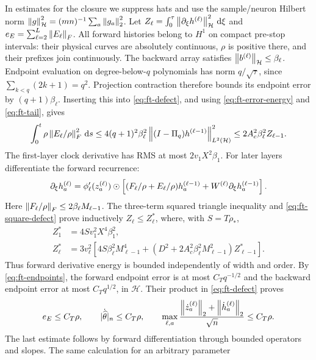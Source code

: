In estimates for the closure we suppress hats and use the sample/neuron
Hilbert norm
$\left\lVert g\right\rVert_{\mathcal H}^2=(mn)^{-1}\sum_a\left\lVert g_a\right\rVert_2^2$.
Let $Z_\ell=\int_0^\tau\left\lVert \partial_\xi h^{(\ell)}\right\rVert_{\mathcal H}^2
\,\mathrm{d}\xi$ and $e_E=\sum_{\ell=2}^L\left\lVert E_\ell\right\rVert_F$.
All forward histories belong to $H^1$ on compact pre-stop intervals:
their physical curves are absolutely continuous, $\rho$ is positive
there, and their prefixes join continuously.
The backward array satisfies $\left\lVert b^{(\ell)}\right\rVert_{\mathcal H}\le\beta_\ell$.
Endpoint evaluation on degree-below-$q$ polynomials has norm
$q/\sqrt\tau$, since $\sum_{k<q}(2k+1)=q^2$.
Projection contraction therefore bounds its endpoint error by
$(q+1)\beta_\ell$.  Inserting this into \eqref{eq:ft-defect}, and using
\eqref{eq:ft-error-energy} and \eqref{eq:ft-tail}, gives
\begin{equation}
 \int_0^t\rho\left\lVert E_\ell/\rho\right\rVert_F^2\,\mathrm{d} s
 \le4(q+1)^2\beta_\ell^2
       \left\lVert (I-\Pi_q)h^{(\ell-1)}\right\rVert_{L^2(\mathcal H)}^2
 \le2A_c^2\beta_\ell^2Z_{\ell-1}.
 \label{eq:ft-square-defect}
\end{equation}
The first-layer clock derivative has RMS at most
$2v_1X^2\beta_1$.  For later layers differentiate the forward recurrence:
\[
 \partial_\xi h_a^{(\ell)}=\phi_\ell'(z_a^{(\ell)})\mathbin{\odot}
 \left[(F_\ell/\rho+E_\ell/\rho)h_a^{(\ell-1)}
                    +W^{(\ell)}\partial_\xi h_a^{(\ell-1)}\right].
\]
Here $\left\lVert F_\ell/\rho\right\rVert_F\le2\beta_\ell M_{\ell-1}$.
The three-term squared triangle inequality and
\eqref{eq:ft-square-defect} prove inductively $Z_\ell\le Z_\ell^*$,
where, with $S=T\rho_*$,
\begin{align*}
 Z_1^*&=4Sv_1^2X^4\beta_1^2,\\
 Z_\ell^*&=3v_\ell^2\left[
       4S\beta_\ell^2M_{\ell-1}^4+
       (D^2+2A_c^2\beta_\ell^2M_{\ell-1}^2)Z_{\ell-1}^*\right].
\end{align*}
Thus forward derivative energy is bounded independently of width and order.
By \eqref{eq:ft-endpoints}, the forward endpoint error is at most
$C_Tq^{-1/2}$ and the backward endpoint error at most $C_Tq^{1/2}$,
in $\mathcal H$.  Their product in \eqref{eq:ft-defect} proves
\begin{equation}
 e_E\le C_T\rho,\qquad |\dot{\widehat\theta}|_n\le C_T\rho,
 \qquad\max_{\ell,a}
 \frac{\left\lVert \dot z_a^{(\ell)}\right\rVert_2+\left\lVert \dot h_a^{(\ell)}\right\rVert_2}{\sqrt n}
       \le C_T\rho.
 \label{eq:ft-relative}
\end{equation}
The last estimate follows by forward differentiation through bounded
operators and slopes.  The same calculation for an arbitrary parameter
